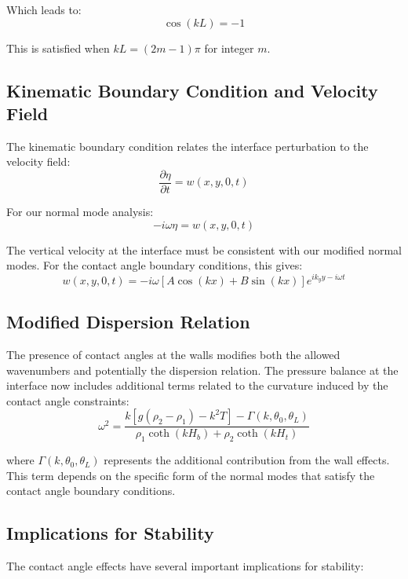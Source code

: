 \documentclass[12pt,a4paper]{article}
\begin{document}
Which leads to:
\begin{equation}
\cos(kL) = -1
\end{equation}

This is satisfied when $kL = (2m-1)\pi$ for integer $m$.

\subsection{Kinematic Boundary Condition and Velocity Field}
The kinematic boundary condition relates the interface perturbation to the velocity field:
\begin{equation}
\frac{\partial \eta}{\partial t} = w(x,y,0,t)
\end{equation}

For our normal mode analysis:
\begin{equation}
-i\omega\eta = w(x,y,0,t)
\end{equation}

The vertical velocity at the interface must be consistent with our modified normal modes. For the contact angle boundary conditions, this gives:
\begin{equation}
w(x,y,0,t) = -i\omega[A\cos(kx) + B\sin(kx)]e^{ik_y y - i\omega t}
\end{equation}

\subsection{Modified Dispersion Relation}
The presence of contact angles at the walls modifies both the allowed wavenumbers and potentially the dispersion relation. The pressure balance at the interface now includes additional terms related to the curvature induced by the contact angle constraints:
\begin{equation}
\omega^2 = \frac{k[g(\rho_2 - \rho_1) - k^2T] - \Gamma(k,\theta_0,\theta_L)}{\rho_1\coth(kH_b) + \rho_2\coth(kH_t)}
\end{equation}

where $\Gamma(k,\theta_0,\theta_L)$ represents the additional contribution from the wall effects. This term depends on the specific form of the normal modes that satisfy the contact angle boundary conditions.

\subsection{Implications for Stability}
The contact angle effects have several important implications for stability:
\end{document}
